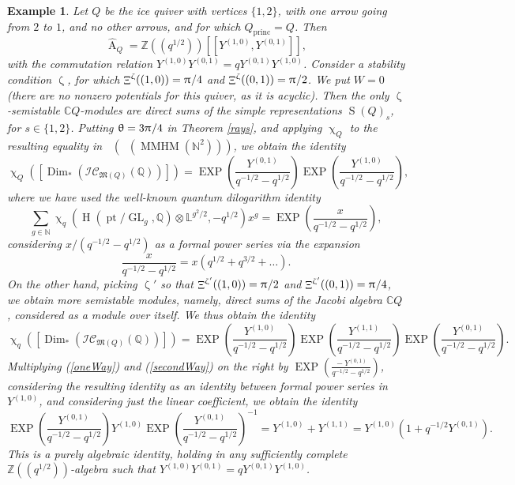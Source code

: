\documentclass[a4paper,10pt]{amsart}
\newtheorem{example}[theorem]{Example}
\newcommand{\LL}{\mathbb{L}}
\newcommand{\QQ}{\mathbb{Q}}
\DeclareMathOperator{\Simp}{S}
\newcommand{\Mst}{\mathfrak{M}}
\newcommand{\ICS}{\mathcal{IC}}
\renewcommand{\theta}{\uptheta}
\renewcommand{\zeta}{\upzeta}
\renewcommand{\pi}{\uppi\hspace{0.05em}}
\renewcommand{\chi}{\upchi}
\DeclareMathOperator{\KK}{K_0}
\DeclareMathOperator{\Dim}{Dim}
\DeclareMathOperator{\Ror}{A}
\DeclareMathOperator{\Mu}{\Upxi}
\DeclareMathOperator{\MMHM}{MMHM}
\DeclareMathOperator{\Gl}{GL}
\DeclareMathOperator{\pt}{pt}
\DeclareMathOperator{\EXP}{EXP}
\DeclareMathOperator{\princ}{princ}
\DeclareMathOperator{\HO}{H}
\DeclareMathOperator{\Dulf}{\mathcal{D}^{\geq, lf}}
\begin{document}
\begin{example}
\label{basicWCF}
Let $Q$ be the ice quiver with vertices $\{1,2\}$, with one arrow going from $2$ to $1$, and no other arrows, and for which $Q_{\princ}=Q$.  Then 
\[
\hat{\Ror}_Q= \mathbb{Z}((q^{1/2}))[[Y^{(1,0)},Y^{(0,1)}]],
\]
with the commutation relation $Y^{(1,0)}Y^{(0,1)}=qY^{(0,1)}Y^{(1,0)}$.  Consider a stability condition $\zeta$, for which $\Mu^{\zeta}((1,0))=\pi/4$ and $\Mu^{\zeta}((0,1))=\pi/2$.  We put $W=0$ (there are no nonzero potentials for this quiver, as it is acyclic).  Then the only $\zeta$-semistable $\mathbb{C}Q$-modules are direct sums of the simple representations $\Simp(Q)_s$, for $s\in \{1,2\}$.  Putting $\theta=3\pi/4$ in Theorem \ref{rays}, and applying $\chi_Q$ to the resulting equality in $\KK(\Dulf(\MMHM(\mathbb{N}^2)))$, we obtain the identity
\begin{equation}
\label{oneWay}
\chi_Q\left([\Dim_*(\ICS_{\Mst(Q)}(\mathbb{Q}))]\right)=\EXP\left(\frac{Y^{(0,1)}}{q^{-1/2}-q^{1/2}}\right)\EXP\left(\frac{Y^{(1,0)}}{q^{-1/2}-q^{1/2}}\right),
\end{equation}
where we have used the well-known quantum dilogarithm identity
\begin{equation}
\label{dilogId}
\sum_{g\in\mathbb{N}}\chi_q\left(\HO(\pt/\Gl_g,\QQ)\otimes \LL^{g^2/2},-q^{1/2}\right)x^g=\EXP\left(\frac{x}{q^{-1/2}-q^{1/2}}\right),
\end{equation}
considering $x/(q^{-1/2}-q^{1/2})$ as a formal power series via the expansion
\[
\frac{x}{q^{-1/2}-q^{1/2}}=x(q^{1/2}+q^{3/2}+\ldots).
\]
On the other hand, picking $\zeta'$ so that $\Mu^{\zeta'}((1,0))=\pi/2$ and $\Mu^{\zeta'}((0,1))=\pi/4$, we obtain more semistable modules, namely, direct sums of the Jacobi algebra $\mathbb{C}Q$, considered as a module over itself.  We thus obtain the identity
\begin{equation}
\label{secondWay}
\chi_q\left([\Dim_*(\ICS_{\Mst(Q)}(\QQ))]\right)=\EXP\left(\frac{Y^{(1,0)}}{q^{-1/2}-q^{1/2}}\right)\EXP\left(\frac{Y^{(1,1)}}{q^{-1/2}-q^{1/2}}\right)\EXP\left(\frac{Y^{(0,1)}}{q^{-1/2}-q^{1/2}}\right).
\end{equation}
Multiplying (\ref{oneWay}) and (\ref{secondWay}) on the right by $\EXP\left(\frac{{}-Y^{(0,1)}}{q^{-1/2}-q^{1/2}}\right)$, considering the resulting identity as an identity between formal power series in $Y^{(1,0)}$, and considering just the linear coefficient, we obtain the identity
\begin{equation}
\label{EfId}
\EXP\left(\frac{Y^{(0,1)}}{q^{-1/2}-q^{1/2}}\right)Y^{(1,0)}\EXP\left(\frac{Y^{(0,1)}}{q^{-1/2}-q^{1/2}}\right)^{-1}=Y^{(1,0)}+Y^{(1,1)}=Y^{(1,0)}(1+q^{-1/2}Y^{(0,1)}).
\end{equation}
This is a purely algebraic identity, holding in any sufficiently complete $\mathbb{Z}((q^{1/2}))$-algebra such that $Y^{(1,0)}Y^{(0,1)}=qY^{(0,1)}Y^{(1,0)}$.  


\end{example}
\end{document}
